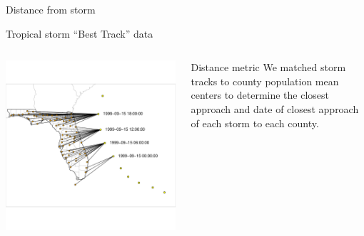 \documentclass[ignorenonframetext,]{beamer}
\begin{document}
\begin{frame}{Distance from storm}

\large Tropical storm ``Best Track'' data \vspace{-0.7cm}

\begin{columns}
\begin{column}{0.7\textwidth}

\includegraphics[width=\textwidth]{finding_closest_point} 
\end{column}
\begin{column}{0.3\textwidth}
\small
\begin{block}{Distance metric}
We matched storm tracks to county population mean centers to determine the closest approach and date of closest approach of each storm to each county.
\end{block}
\end{column}
\end{columns}

\end{frame}
\end{document}
